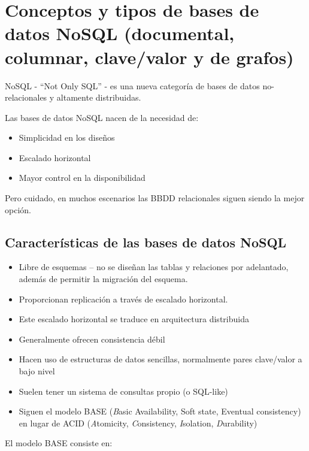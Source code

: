 \documentclass[
]{book}
\providecommand{\tightlist}{%
  \setlength{\itemsep}{0pt}\setlength{\parskip}{0pt}}
\theoremstyle{break}
\theoremstyle{nonumberplain}
\begin{document}
\section{Conceptos y tipos de bases de datos NoSQL (documental, columnar, clave/valor y de grafos)}\label{conceptos-y-tipos-de-bases-de-datos-nosql-documental-columnar-clavevalor-y-de-grafos}

NoSQL - ``Not Only SQL'' - es una nueva categoría de bases de datos no-relacionales y altamente distribuidas.

Las bases de datos NoSQL nacen de la necesidad de:

\begin{itemize}
\item
  Simplicidad en los diseños
\item
  Escalado horizontal
\item
  Mayor control en la disponibilidad
\end{itemize}

Pero cuidado, en muchos escenarios las BBDD relacionales siguen siendo la mejor opción.

\subsection{Características de las bases de datos NoSQL}\label{caracteruxedsticas-de-las-bases-de-datos-nosql}

\begin{itemize}
\tightlist
\item
  Libre de esquemas -- no se diseñan las tablas y relaciones por adelantado, además de permitir la migración del esquema.
\item
  Proporcionan replicación a través de escalado horizontal.
\item
  Este escalado horizontal se traduce en arquitectura distribuida
\item
  Generalmente ofrecen consistencia débil
\item
  Hacen uso de estructuras de datos sencillas, normalmente pares clave/valor a bajo nivel
\item
  Suelen tener un sistema de consultas propio (o SQL-like)
\item
  Siguen el modelo BASE (\emph{B}asic Availability, Soft state, Eventual consistency) en lugar de ACID (\emph{A}tomicity, \emph{C}onsistency, \emph{I}solation, \emph{D}urability)
\end{itemize}

El modelo BASE consiste en:
\end{document}
